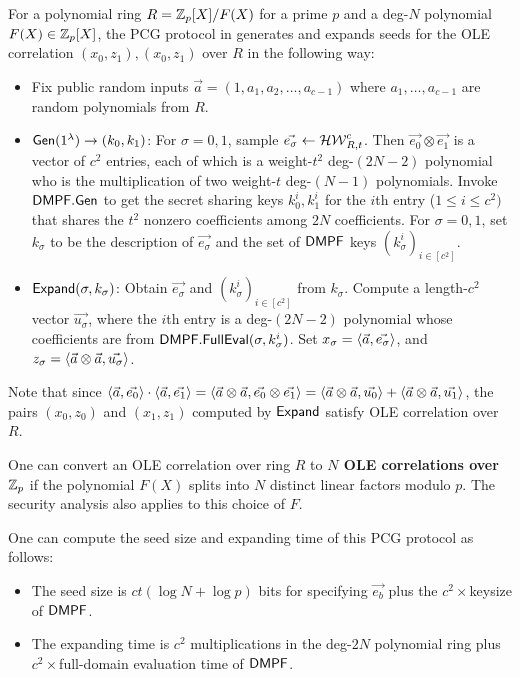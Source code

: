 For a polynomial ring $R = \mathbb{Z}_p[X]/F(X)$ for a prime $p$ and a deg-$N$ polynomial $F(X)\in \mathbb{Z}_p[X]$, the PCG protocol in \cite{cryptoeprint:2022/1035} generates and expands seeds for the OLE correlation $(x_0,z_1),(x_0,z_1)$ over $R$ in the following way: 
\begin{itemize}
    \item Fix public random inputs $\vec{a} = (1, a_1,a_2,\dots,a_{c-1})$ where $a_1,\dots,a_{c-1}$ are random polynomials from $R$. 
    \item ${\sf Gen}(1^\lambda)\rightarrow (k_0,k_1)$: For $\sigma = 0,1$, sample $\vec{e_\sigma}\gets \mathcal{HW}^c_{R,t}$. Then $\vec{e_0}\otimes \vec{e_1}$ is a vector of $c^2$ entries, each of which is a weight-$t^2$ deg-$(2N-2)$ polynomial who is the multiplication of two weight-$t$ deg-$(N-1)$ polynomials. Invoke ${\sf DMPF}.{\sf Gen}$ to get the secret sharing keys $k_0^{i},k_1^i$ for the $i$th entry ($1\le i\le c^2)$ that shares the $t^2$ nonzero coefficients among $2N$ coefficients. For $\sigma = 0,1$, set $k_\sigma$ to be the description of $\vec{e_\sigma}$ and the set of ${\sf DMPF}$ keys $(k_\sigma^i)_{i\in[c^2]}$. 
    \item ${\sf Expand}(\sigma, k_\sigma)$: Obtain $\vec{e_\sigma}$ and $(k_\sigma^i)_{i\in[c^2]}$ from $k_\sigma$. Compute a length-$c^2$ vector $\vec{u_\sigma}$, where the $i$th entry is a deg-$(2N-2)$ polynomial whose coefficients are from ${\sf DMPF}.{\sf FullEval}(\sigma, k_\sigma^i)$. Set $x_\sigma = \langle \vec{a}, \vec{e_\sigma} \rangle$, and $z_\sigma = \langle \vec{a}\otimes\vec{a}, \vec{u_\sigma} \rangle$. 
\end{itemize}
Note that since $\langle \vec{a},  \vec{e_0} \rangle\cdot \langle \vec{a}, \vec{e_1} \rangle = \langle \vec{a}\otimes \vec{a}, \vec{e_0}\otimes \vec{e_1} \rangle = \langle \vec{a}\otimes\vec{a}, \vec{u_0} \rangle + \langle \vec{a}\otimes\vec{a}, \vec{u_1} \rangle$, the pairs $(x_0,z_0)$ and $(x_1,z_1)$ computed by ${\sf Expand}$ satisfy OLE correlation over $R$. 

\begin{remark}\label{rem:use_reducible_ring}
    One can convert an OLE correlation over ring $R$ to \textbf{$N$ OLE correlations over $\mathbb{Z}_p$} if the polynomial $F(X)$ splits into $N$ distinct linear factors modulo $p$\cite{cryptoeprint:2022/1035}. The security analysis also applies to this choice of $F$.  
\end{remark}

One can compute the seed size and expanding time of this PCG protocol as follows: 
\begin{itemize}
    \item The seed size is $ct(\log N+\log p)$ bits for specifying $\vec{e_b}$ plus the $c^2\times $keysize of ${\sf DMPF}$. 
    \item The expanding time is $c^2$ multiplications in the deg-$2N$ polynomial ring plus $c^2\times$full-domain evaluation time of ${\sf DMPF}$. 
\end{itemize}

